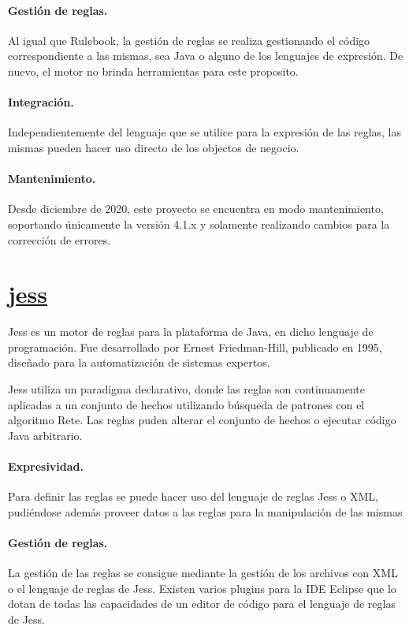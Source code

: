 \inputminted{java}{code/EasyRules.java}

\paragraph{Gestión de reglas.}
Al igual que Rulebook, la gestión de reglas se realiza gestionando el código correspondiente a las mismas, sea Java o alguno de los lenguajes de expresión. De nuevo, el motor no brinda herramientas para este proposito.

\paragraph{Integración.}
Independientemente del lenguaje que se utilice para la expresión de las reglas, las mismas pueden hacer uso directo de los objectos de negocio.

\paragraph{Mantenimiento.}
Desde diciembre de 2020, este proyecto se encuentra en modo mantenimiento, soportando únicamente la versión 4.1.x y solamente realizando cambios para la corrección de errores.

\section{\href{http://alvarestech.com/temp/fuzzyjess/Jess60/Jess70b7/docs/index.html}{jess}}
Jess es un motor de reglas para la plataforma de Java, en dicho lenguaje de programación. Fue desarrollado por Ernest Friedman-Hill, publicado en 1995, diseñado para la automatización de sistemas expertos.

Jess utiliza un paradigma declarativo, donde las reglas son continuamente aplicadas a un conjunto de hechos utilizando búsqueda de patrones con el algoritmo Rete. Las reglas puden alterar el conjunto de hechos o ejecutar código Java arbitrario.

\paragraph{Expresividad.}
Para definir las reglas se puede hacer uso del lenguaje de reglas Jess o XML, pudiéndose además proveer datos a las reglas para la manipulación de las mismas

\paragraph{Gestión de reglas.}
La gestión de las reglas se consigue mediante la gestión de los archivos con XML o el lenguaje de reglas de Jess. Existen varios plugins para la IDE Eclipse que lo dotan de todas las capacidades de un editor de código para el lenguaje de reglas de Jess.

